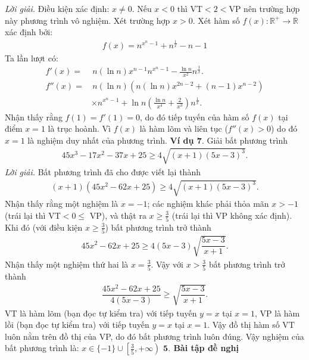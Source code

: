 \begin{multicols}{2}
	\textit{Lời giải.} Điều kiện xác định: $x \neq 0$. 
	Nếu $x<0$ thì VT$<2<$VP nên trường hợp này phương trình vô nghiệm.
	\vskip 0.1cm
	Xét trường hợp $x>0$. Xét hàm số $f(x):\mathbb R^+\to \mathbb R$ xác định bởi:
	\begin{align*}
		f(x)=n^{x^n-1}+n^{\frac 1x}-n-1
	\end{align*}
	Ta lần lượt có:
	\begin{align*}
		f'(x)=&\,n(\ln n)x^{n-1}n^{x^n-1}-\frac {\ln n}{x^2}n^{\frac 1x}.\\
		f''(x)=&\,n(\ln n)\left(n(\ln n)x^{2n-2}+(n-1)x^{n-2}\right)\\
		&\times n^{x^n-1}+\ln n\left(\frac {\ln n}{x^4}+\frac 2{x^3}\right)n^{\frac 1x}.
	\end{align*}
	Nhận thấy rằng $f(1)=f'(1)=0$, do đó tiếp tuyến của hàm số $f(x)$ tại điểm $x=1$ là trục hoành.
	\vskip 0.1cm 
	Vì $f(x)$ là hàm lõm và liên tục ($f''(x)>0$) do đó $x=1$ là nghiệm duy nhất của phương trình. 
	\vskip 0.1cm
	\textbf{\color{diendantoanhoc}Ví dụ $\pmb{7.}$} Giải bất phương trình
	\begin{align*}
		45x^3\!-\!17x^2\!-\!37x\!+\!25\!\ge\! 4\sqrt{\!\!(x\!+\!1)(5x\!-\!3)^3}.
	\end{align*}
	\textit{Lời giải.} Bất phương trình đã cho được viết lại thành 
	\begin{align*}
		(x\!+\!1\!)(45x^2\!-\!62x\!+\!25)\!\ge\! 4\sqrt{\!\!(x\!+\!1\!)(5x\!-\!3)^3}.
	\end{align*}
	Nhận thấy rằng một nghiệm là $x=-1$; các nghiệm khác phải thỏa mãn $x>-1$ (trái lại thì VT$<0\le$ VP), và thật ra $x\ge\frac 35$ (trái lại thì VP không xác định).
	\vskip 0.1cm
	Khi đó (với điều kiện $x\ge\frac 35$) bất phương trình trở thành
	\begin{align*}
		45x^2-62x+25\ge 4(5x-3)\sqrt{\dfrac{5x-3}{x+1}}.
	\end{align*}
	Nhận thấy một nghiệm thứ hai là $x=\frac 35$. Vậy với $x>\frac 35$ bất phương trình trở thành
	\begin{align*}
		\dfrac{45x^2-62x+25}{4(5x-3)}\ge \sqrt{\dfrac{5x-3}{x+1}}.
	\end{align*}
	VT là hàm lõm (bạn đọc tự kiểm tra) với tiếp tuyến $y=x$ tại $x=1$, VP là hàm lồi (bạn đọc tự kiểm tra) với tiếp tuyến $y=x$ tại $x=1$. Vậy đồ thị hàm số VT luôn nằm trên đồ thị của VP,  do đó bất phương trình luôn đúng.
	\vskip 0.1cm
	Vậy nghiệm của bất phương trình là: \linebreak $x\in\{-1\}\cup\left[\frac 35,+\infty\right)$
	\vskip 0.1cm
	\textbf{\color{diendantoanhoc}$\pmb{5.}$ Bài tập đề nghị}

\end{multicols}
